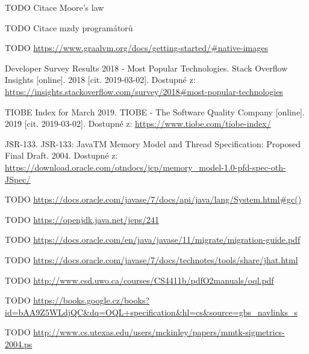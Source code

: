 \begin{literatura}{99}

    TODO Citace Moore's law

    TODO Citace mzdy programátorů

    TODO \url{https://www.graalvm.org/docs/getting-started/#native-images}

	Developer Survey Results 2018 - Most Popular Technologies. Stack Overflow Insights [online]. 2018 [cit. 2019-03-02]. Dostupné z: \url{https://insights.stackoverflow.com/survey/2018#most-popular-technologies}

    TIOBE Index for March 2019. TIOBE - The Software Quality Company [online]. 2019 [cit. 2019-03-02]. Dostupné z: \url{https://www.tiobe.com/tiobe-index/}

    JSR-133. JSR-133: JavaTM Memory Model and Thread Specification: Proposed Final Draft. 2004. Dostupné z: \url{https://download.oracle.com/otndocs/jcp/memory_model-1.0-pfd-spec-oth-JSpec/}
    
    TODO \url{https://docs.oracle.com/javase/7/docs/api/java/lang/System.html#gc()}

    TODO \url{https://openjdk.java.net/jeps/241}

    TODO \url{https://docs.oracle.com/en/java/javase/11/migrate/migration-guide.pdf }

    TODO \url{https://docs.oracle.com/javase/7/docs/technotes/tools/share/jhat.html}

    TODO \url{http://www.csd.uwo.ca/courses/CS4411b/pdfO2manuals/oql.pdf}

    TODO \url{https://books.google.cz/books?id=bAA9Z5WLdjQC&dq=OQL+specification&hl=cs&source=gbs_navlinks_s}

    TODO \url{http://www.cs.utexas.edu/users/mckinley/papers/mmtk-sigmetrics-2004.ps}

\end{literatura}